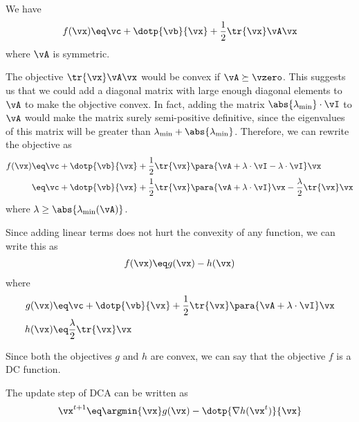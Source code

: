 \documentclass{article}
\begin{document}
\begin{question}

	\begin{qpart}{1}

		We have
		\begin{align*}
			f(\vx) \eq \vc + \dotp{\vb}{\vx} + \frac{1}{2} \tr{\vx} \vA \vx
		\end{align*}
		where $\vA$ is symmetric.

		The objective $\tr{\vx} \vA \vx$ would be convex if $\vA \succeq \vzero$. This suggests us that we could add a diagonal matrix with large enough diagonal elements to $\vA$ to make the objective convex. In fact, adding the matrix $\abs{\lambda_{\text{min}}} \cdot \vI$ to $\vA$ would make the matrix surely semi-positive definitive, since the eigenvalues of this matrix will be greater than $\lambda_{\text{min}} + \abs{\lambda_{\text{min}}}$. Therefore, we can rewrite the objective as
		\begin{align*}
			f(\vx) &\eq \vc + \dotp{\vb}{\vx} + \frac{1}{2} \tr{\vx} \para{\vA + \lambda \cdot \vI - \lambda \cdot \vI} \vx \\
		&\eq \vc + \dotp{\vb}{\vx} + \frac{1}{2} \tr{\vx} \para{\vA + \lambda \cdot \vI} \vx - \frac{\lambda}{2} \tr{\vx} \vx
		\end{align*}
		where $\lambda \ge \abs{\lambda_{\text{min}}(\vA)}$.

		Since adding linear terms does not hurt the convexity of any function, we can write this as
		\begin{align*}
			f(\vx) \eq g(\vx) - h(\vx)
		\end{align*}
		where
		\begin{align*}
			g(\vx) &\eq \vc + \dotp{\vb}{\vx} + \frac{1}{2} \tr{\vx} \para{\vA + \lambda \cdot \vI} \vx \\
			h(\vx) &\eq \frac{\lambda}{2} \tr{\vx} \vx \\
		\end{align*}

		Since both the objectives $g$ and $h$ are convex, we can say that the objective $f$ is a DC function.

	\end{qpart}

	\begin{qpart}{2}

		The update step of DCA can be written as
		\begin{align*}
			\vx^{t + 1} \eq \argmin{\vx} g(\vx) - \dotp{\nabla h(\vx^t)}{\vx}
		\end{align*}


\end{qpart}
\end{question}
\end{document}
